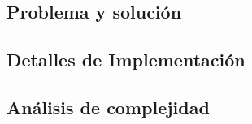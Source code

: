\subsection*{Problema y solución}

\subsection*{Detalles de Implementación}

\subsection*{Análisis de complejidad}